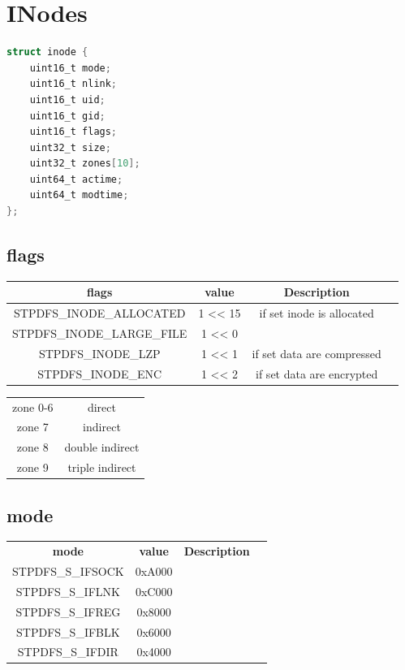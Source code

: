 \documentclass[a4paper, 12pt, openright, english]{scrbook}
\begin{document}
	\section{INodes}

	\begin{lstlisting}[language=C]
struct inode {
	uint16_t mode;
	uint16_t nlink;
	uint16_t uid;
	uint16_t gid;
	uint16_t flags;
	uint32_t size;
	uint32_t zones[10];
	uint64_t actime;
	uint64_t modtime;
};
	\end{lstlisting}
	
	\subsection{flags}

	\begin{center}
		\begin{tabular}{ |c|c|c|c| } 
 			\hline
	 		\textbf{flags} & \textbf{value} & \textbf{Description}  \\ 
			\hline
			STPDFS\_INODE\_ALLOCATED & 1 << 15 & if set inode is allocated \\
			STPDFS\_INODE\_LARGE\_FILE & 1 << 0 & \\
			STPDFS\_INODE\_LZP & 1 << 1 & if set data are compressed \\
			STPDFS\_INODE\_ENC &  1 << 2 & if set data are encrypted \\
 		\hline
		\end{tabular}
	\end{center}

	\begin{center}
		\begin{tabular}{ |c|c| }
			zone 0-6 & direct \\
			zone 7 & indirect \\
			zone 8 & double indirect \\
			zone 9 & triple indirect \\
		\end{tabular}
	\end{center}

	\subsection{mode}

	\begin{center}
		\begin{tabular}{ |c|c|c|c| } 
 			\hline
 			\textbf{mode} & \textbf{value} & \textbf{Description}  \\ 
			 STPDFS\_S\_IFSOCK & 0xA000 & \\
			STPDFS\_S\_IFLNK  & 0xC000 & \\
			STPDFS\_S\_IFREG & 0x8000 & \\
			STPDFS\_S\_IFBLK  & 0x6000 & \\
			STPDFS\_S\_IFDIR &  0x4000 & \\
 			\hline
		\end{tabular}
	\end{center}

	\appendix
\end{document}
